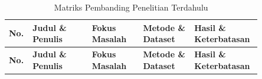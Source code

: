 \begin{landscape}
\begin{longtable}{|>{\centering\arraybackslash}b{0.04\linewidth}|>{\raggedright\arraybackslash}p{0.22\linewidth}|>{\raggedright\arraybackslash}p{0.19\linewidth}|>{\raggedright\arraybackslash}p{0.19\linewidth}|>{\raggedright\arraybackslash}p{0.21\linewidth}|}
	\caption{Matriks Pembanding Penelitian Terdahulu}
	\label{table:2.literasi}\\
	\hline
	\textbf{No.} & \textbf{Judul \& Penulis} & \textbf{Fokus Masalah} & \textbf{Metode \& Dataset} & \textbf{Hasil \& Keterbatasan} \\
	\hline
	\endfirsthead
	\hline
	\textbf{No.} & \textbf{Judul \& Penulis} & \textbf{Fokus Masalah} & \textbf{Metode \& Dataset} & \textbf{Hasil \& Keterbatasan} \\
	\hline
	\endhead


\end{longtable}
\end{landscape}
